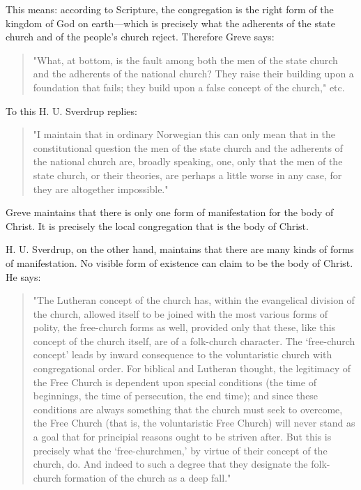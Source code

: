 This means: according to Scripture, the congregation is the right form of the kingdom of God on earth—which is precisely what the adherents of the state church and of the people’s church reject. Therefore Greve says:

\begin{quote}
"What, at bottom, is the fault among both the men of the state church and the adherents of the national church? They raise their building upon a foundation that fails; they build upon a false concept of the church," etc.
\end{quote}

To this H. U. Sverdrup replies:

\begin{quote}
"I maintain that in ordinary Norwegian this can only mean that in the constitutional question the men of the state church and the adherents of the national church are, broadly speaking, one, only that the men of the state church, or their theories, are perhaps a little worse in any case, for they are altogether impossible."
\end{quote}

Greve maintains that there is only one form of manifestation for the body of Christ. It is precisely the local congregation that is the body of Christ.

H. U. Sverdrup, on the other hand, maintains that there are many kinds of forms of manifestation. No visible form of existence can claim to be the body of Christ. He says:

\begin{quote}
"The Lutheran concept of the church has, within the evangelical division of the church, allowed itself to be joined with the most various forms of polity, the free-church forms as well, provided only that these, like this concept of the church itself, are of a folk-church character. The ‘free-church concept’ leads by inward consequence to the voluntaristic church with congregational order. For biblical and Lutheran thought, the legitimacy of the Free Church is dependent upon special conditions (the time of beginnings, the time of persecution, the end time); and since these conditions are always something that the church must seek to overcome, the Free Church (that is, the voluntaristic Free Church) will never stand as a goal that for principial reasons ought to be striven after. But this is precisely what the ‘free-churchmen,’ by virtue of their concept of the church, do. And indeed to such a degree that they designate the folk-church formation of the church as a deep fall."
\end{quote}


